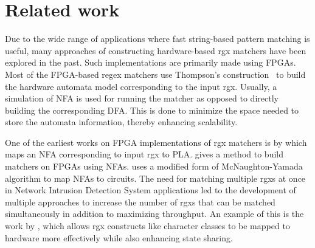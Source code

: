 \section{Related work} \label{sec:literature}
Due to the wide range of applications where fast string-based pattern
matching is useful, many approaches of constructing hardware-based
\gls{rgx} matchers have been explored in the past.
Such implementations are primarily made using \glspl{FPGA}.
%
Most of the \gls{FPGA}-based regex matchers use Thompson's
construction~\cite{thompson1968nfa} to build the hardware automata
model corresponding to the input \gls{rgx}.
Usually, a simulation of \gls{NFA} is used for running the matcher as
opposed to directly building the corresponding \gls{DFA}.
This is done to minimize the space needed to store the automata
information, thereby enhancing scalability.

One of the earliest works on \gls{FPGA} implementations of \gls{rgx}
matchers is by \citet{floyd1982compilation}
which maps an \gls{NFA} corresponding to input \gls{rgx} to \gls{PLA}.
%
\citet{sidhu2001fast} gives a method to build matchers on \glspl{FPGA}
using \glspl{NFA}.
\citet{yang2011high} uses a modified form of McNaughton-Yamada
algorithm \cite{mcnaughton1960regular} to map \glspl{NFA} to circuits.
%
%
%
The need for matching multiple \glspl{rgx} at once in Network
Intrusion Detection System
applications led to the development of multiple approaches to increase
the number of \glspl{rgx} that can be matched simultaneously in
addition to maximizing throughput.
%
An example of this is the work by \citet{van2012hardware}, which
allows \gls{rgx} constructs like character classes to be mapped to
hardware more effectively while also enhancing state sharing.




